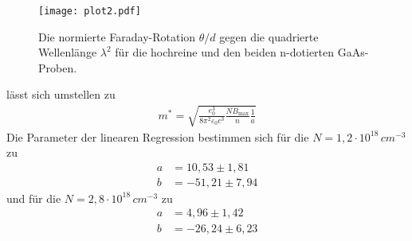 \begin{figure}[hbt!]
  \label{fig:diff}
  \texttt{[image: plot2.pdf]}
  \caption{Die normierte Faraday-Rotation $\theta/d$ gegen die quadrierte Wellenlänge $\lambda^2$ für die
  hochreine und den beiden n-dotierten GaAs-Proben.}
\end{figure}
 lässt sich umstellen zu
 \begin{align*}
  m^{*} = \sqrt{\frac{e_0^3}{8\pi^2 \varepsilon_0 c^3} \frac{N B_\text{max}}{n} \frac{1}{a}}
  \end{align*}
Die Parameter der linearen Regression bestimmen sich für die $N=1,2\cdot 10^{18}\,cm^{-3}$ zu
\begin{align*}
  a &= 10,53 \pm 1,81 \\
  b &= -51,21 \pm 7,94
\end{align*}
und für die $N=2,8\cdot 10^{18}\,cm^{-3}$ zu
\begin{align*}
  a &= 4,96 \pm 1,42 \\
  b &= -26,24 \pm 6,23
\end{align*}